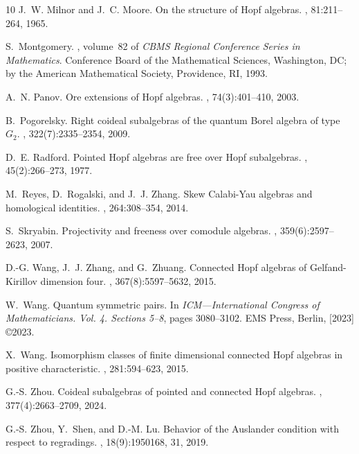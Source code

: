 \documentclass{article}
\theoremstyle{plain}
\theoremstyle{definition}
\numberwithin{equation}{section}
\begin{document}
\begin{thebibliography}{10}
J.~W. Milnor and J.~C. Moore.
\newblock On the structure of {H}opf algebras.
, 81:211--264, 1965.

S.~Montgomery.
, volume~82 of {\em
  CBMS Regional Conference Series in Mathematics}.
\newblock Conference Board of the Mathematical Sciences, Washington, DC; by the
  American Mathematical Society, Providence, RI, 1993.

A.~N. Panov.
\newblock Ore extensions of {H}opf algebras.
, 74(3):401--410, 2003.

B.~Pogorelsky.
\newblock Right coideal subalgebras of the quantum {B}orel algebra of type
  {$G_2$}.
, 322(7):2335--2354, 2009.

D.~E. Radford.
\newblock Pointed {H}opf algebras are free over {H}opf subalgebras.
, 45(2):266--273, 1977.

M.~Reyes, D.~Rogalski, and J.~J. Zhang.
\newblock Skew {C}alabi-{Y}au algebras and homological identities.
, 264:308--354, 2014.

S.~Skryabin.
\newblock Projectivity and freeness over comodule algebras.
, 359(6):2597--2623, 2007.

D.-G. Wang, J.~J. Zhang, and G.~Zhuang.
\newblock Connected {H}opf algebras of {G}elfand-{K}irillov dimension four.
, 367(8):5597--5632, 2015.

W.~Wang.
\newblock Quantum symmetric pairs.
\newblock In {\em I{CM}---{I}nternational {C}ongress of {M}athematicians.
  {V}ol. 4. {S}ections 5--8}, pages 3080--3102. EMS Press, Berlin, [2023]
  \copyright 2023.

X.~Wang.
\newblock Isomorphism classes of finite dimensional connected {H}opf algebras
  in positive characteristic.
, 281:594--623, 2015.

G.-S. Zhou.
\newblock Coideal subalgebras of pointed and connected {H}opf algebras.
, 377(4):2663--2709, 2024.

G.-S. Zhou, Y.~Shen, and D.-M. Lu.
\newblock Behavior of the {A}uslander condition with respect to regradings.
, 18(9):1950168, 31, 2019.


\end{thebibliography}
\end{document}
